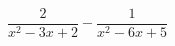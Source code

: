 \begin{ex}[type=expression]
	\begin{condition}
		\(\dfrac{2}{x^2-3x+2}-\dfrac{1}{x^2-6x+5}\)
	\end{condition}
\end{ex}